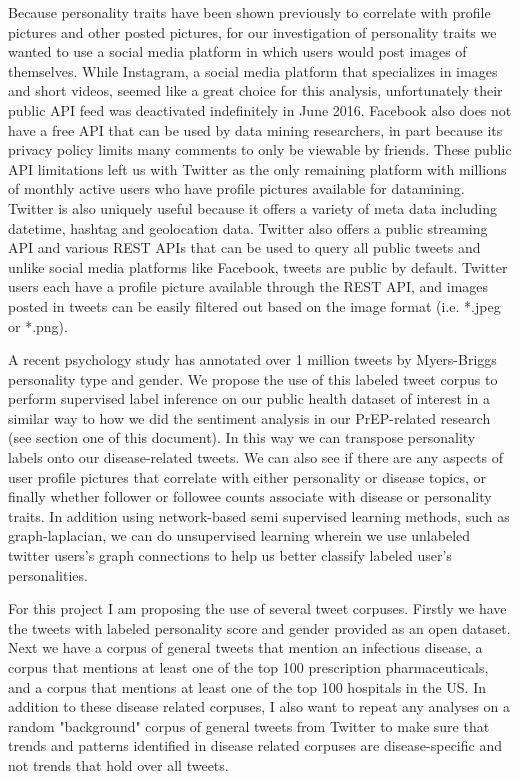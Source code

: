 Because personality traits have been shown previously to correlate with profile pictures and other posted pictures\cite{ong2011narcissism}, for our investigation of personality traits we wanted to use a social media platform in which users would post images of themselves. While Instagram, a social media platform that specializes in images and short videos, seemed like a great choice for this analysis, unfortunately their public API feed was deactivated indefinitely in June 2016. Facebook also does not have a free API that can be used by data mining researchers, in part because its privacy policy limits many comments to only be viewable by friends. These public API limitations left us with Twitter as the only remaining platform with millions of monthly active users who have profile pictures available for datamining. Twitter is also uniquely useful because it offers a variety of meta data including datetime, hashtag and geolocation data. Twitter also offers a public streaming API and various REST APIs that can be used to query all public tweets and unlike social media platforms like Facebook, tweets are public by default. Twitter users each have a profile picture available through the REST API, and images posted in tweets can be easily filtered out based on the image format (i.e. *.jpeg or *.png).

A recent psychology study has annotated over 1 million tweets by Myers-Briggs personality type and gender\cite{plank2015personality}. We propose the use of this labeled tweet corpus to perform supervised label inference on our public health dataset of interest in a similar way to how we did the sentiment analysis in our PrEP-related research (see section one of this document). In this way we can transpose personality labels onto our disease-related tweets.  We can also see if there are any aspects of user profile pictures that correlate with either personality or disease topics, or finally whether follower or followee counts associate with disease or personality traits. In addition using network-based semi supervised learning methods, such as graph-laplacian\cite{sindhwani2005beyond}, we can do unsupervised learning wherein we use unlabeled twitter users's graph connections to help us better classify labeled user's personalities.

For this project I am proposing the use of several tweet corpuses. Firstly we have the tweets with labeled personality score and gender provided as an open dataset\cite{plank2015personality}. Next we have a corpus of general tweets that mention an infectious disease, a corpus that mentions at least one of the top 100 prescription pharmaceuticals, and a corpus that mentions at least one of the top 100 hospitals in the US. In addition to these disease related corpuses, I also want to repeat any analyses on a random "background" corpus of general tweets from Twitter to make sure that trends and patterns identified in disease related corpuses are disease-specific and not trends that hold over all tweets.

